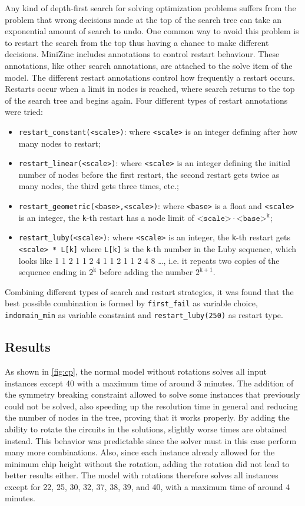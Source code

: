 \documentclass[a4paper, 12pt]{article}
\begin{document}
Any kind of depth-first search for solving optimization problems suffers from the problem that wrong decisions made at the top of the search tree can take an exponential amount of search to undo. One common way to avoid this problem is to restart the search from the top thus having a chance to make different decisions. MiniZinc includes annotations to control restart behaviour. These annotations, like other search annotations, are attached to the solve item of the model. The different restart annotations control how frequently a restart occurs. Restarts occur when a limit in nodes is reached, where search returns to the top of the search tree and begins again. Four different types of restart annotations were tried:
\begin{itemize}
    \item \verb|restart_constant(<scale>)|: where \verb|<scale>| is an integer defining after how many nodes to restart;
    \item \verb|restart_linear(<scale>)|: where \verb|<scale>| is an integer defining the initial number of nodes before the first restart, the second restart gets twice as many nodes, the third gets three times, etc.;
    \item \verb|restart_geometric(<base>,<scale>)|: where \verb|<base>| is a float and \verb|<scale>| is an integer, the \verb|k|-th restart has a node limit of $\texttt{<scale>} \cdot \texttt{<base>}^\texttt{k}$;
    \item \verb|restart_luby(<scale>)|: where \verb|<scale>| is an integer, the \verb|k|-th restart gets \verb|<scale> * L[k]| where \verb|L[k]| is the \verb|k|-th number in the Luby sequence, which looks like 1 1 2 1 1 2 4 1 1 2 1 1 2 4 8 …, i.e. it repeats two copies of the sequence ending in $2^\texttt{k}$ before adding the number $2^{\texttt{k}+1}$.
\end{itemize}

Combining different types of search and restart strategies, it was found that the best possible combination is formed by \verb|first_fail| as variable choice, \verb|indomain_min| as variable constraint and \verb|restart_luby(250)| as restart type.


\subsection{Results}

As shown in \cref{fig:cp}, the normal model without rotations solves all input instances except 40 with a maximum time of around 3 minutes. The addition of the symmetry breaking constraint allowed to solve some instances that previously could not be solved, also speeding up the resolution time in general and reducing the number of nodes in the tree, proving that it works properly. By adding the ability to rotate the circuits in the solutions, slightly worse times are obtained instead. This behavior was predictable since the solver must in this case perform many more combinations. Also, since each instance already allowed for the minimum chip height without the rotation, adding the rotation did not lead to better results either. The model with rotations therefore solves all instances except for 22, 25, 30, 32, 37, 38, 39, and 40, with a maximum time of around 4 minutes.
\end{document}
